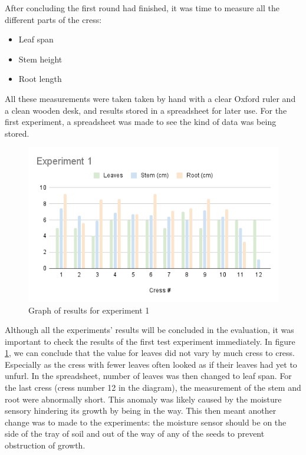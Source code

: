 
After concluding the first round had finished, it was time to measure all the different parts of the cress:

\begin{itemize}
    \item Leaf span
    \vspace{-0.25cm}
    \item Stem height
    \vspace{-0.25cm}
    \item Root length
\end{itemize}

All these measurements were taken taken by hand with a clear Oxford ruler and a clean wooden desk, and results stored in a spreadsheet for later use. For the first experiment, a spreadsheet was made to see the kind of data was being stored.

\begin{figure}[H]
    \centering
    \includegraphics[scale=0.8]{Report/Images/Experiment1.png}
    \caption{Graph of results for experiment 1}
    \label{fig:experiment1}
\end{figure}

Although all the experiments' results will be concluded in the evaluation, it was important to check the results of the first test experiment immediately. In figure \ref{fig:experiment1}, we can conclude that the value for leaves did not vary by much cress to cress. Especially as the cress with fewer leaves often looked as if their leaves had yet to unfurl. In the spreadsheet, number of leaves was then changed to leaf span. For the last cress (cress number 12 in the diagram), the measurement of the stem and root were abnormally short. This anomaly was likely caused by the moisture sensory hindering its growth by being in the way. This then meant another change was to made to the experiments: the moisture sensor should be on the side of the tray of soil and out of the way of any of the seeds to prevent obstruction of growth.

